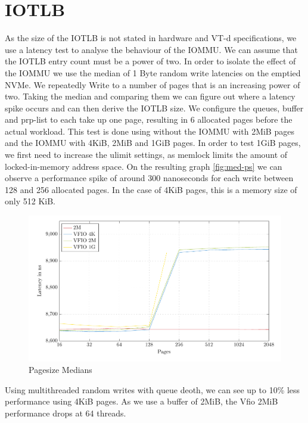 \section{IOTLB}
As the size of the IOTLB is not stated in hardware and VT-d specifications, we use a latency test to analyse the behaviour of the IOMMU. We can assume that the IOTLB entry count must be a power of two. In order to isolate the effect of the IOMMU we use the median of 1 Byte random write latencies on the emptied NVMe. We repeatedly Write to a number of pages that is an increasing power of two. Taking the median and comparing them we can figure out where a latency spike occurs and can then derive the IOTLB size. We configure the queues, buffer and prp-list to each take up one page, resulting in 6 allocated pages before the actual workload. This test is done using without the IOMMU with 2MiB pages and the IOMMU with 4KiB, 2MiB and 1GiB pages.
In order to test 1GiB pages, we first need to increase the ulimit settings, as memlock limits the amount of locked-in-memory address space.
On the resulting graph \autoref{fig:med-ps} we can observe a performance spike of around 300 nanoseconds for each write between 128 and 256 allocated pages. In the case of 4KiB pages, this is a memory size of only 512 KiB.

\begin{figure}
    \centering
    \includegraphics[width=\textwidth]{figures/pagesizemedians}
    \caption{Pagesize Medians}
    \label{fig:med-ps}
\end{figure}

Using multithreaded random writes with queue deoth, we can see up to 10\% less performance using 4KiB pages. As we use a buffer of 2MiB, the Vfio 2MiB performance drops at 64 threads.

